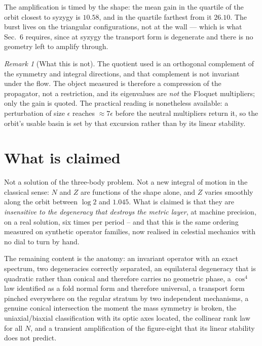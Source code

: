 \documentclass[11pt]{article}
\renewcommand{\S}{Sec.~}
\theoremstyle{remark}
\newtheorem{remark}[theorem]{Remark}
\begin{document}
\noindent
The amplification is timed by the shape: the mean gain in the quartile of the orbit closest
to syzygy is $10.58$, and in the quartile farthest from it $26.10$. The burst lives on the
triangular configurations, not at the wall --- which is what \S6 requires, since at syzygy
the transport form is degenerate and there is no geometry left to amplify through.

\begin{remark}[What this is not]
The quotient used is an orthogonal complement of the symmetry and integral directions, and
that complement is not invariant under the flow. The object measured is therefore a
compression of the propagator, not a restriction, and its eigenvalues are \emph{not} the
Floquet multipliers; only the gain is quoted. The practical reading is nonetheless
available: a perturbation of size $\epsilon$ reaches $\approx7\epsilon$ before the neutral
multipliers return it, so the orbit's usable basin is set by that excursion rather than by
its linear stability.
\end{remark}

\section{What is claimed}

Not a solution of the three-body problem. Not a new integral of motion in the classical
sense: $N$ and $Z$ are functions of the shape alone, and $Z$ varies smoothly along the orbit
between $\log 2$ and $1.045$. What is claimed is that they are \emph{insensitive to the
degeneracy that destroys the metric layer}, at machine precision, on a real solution, six
times per period -- and that this is the same ordering measured on synthetic operator
families, now realised in celestial mechanics with no dial to turn by hand.

The remaining content is the anatomy: an invariant operator with an exact spectrum, two
degeneracies correctly separated, an equilateral degeneracy that is quadratic rather than
conical and therefore carries no geometric phase, a $\cos^4$ law identified as a fold normal
form and therefore universal, a transport form pinched everywhere on the regular stratum by
two independent mechanisms, a genuine conical intersection the moment the mass symmetry is
broken, the uniaxial/biaxial classification with its optic axes located, the collinear rank
law for all $N$, and a transient amplification of the figure-eight that its linear stability
does not predict.
\end{document}
